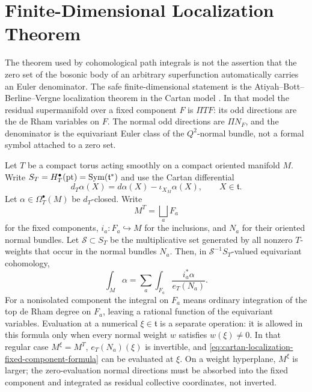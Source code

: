 \section{Finite-Dimensional Localization Theorem}

The theorem used by cohomological path integrals is not the assertion that the
zero set of the bosonic body of an arbitrary superfunction automatically
carries an Euler denominator.  The safe finite-dimensional statement is the
Atiyah--Bott--Berline--Vergne localization theorem in the Cartan model
\cite{AtiyahBott1984MomentMap,BerlineVergne1982Localization}.  In that model
the residual supermanifold over a fixed component \(F\) is \(\Pi TF\): its odd
directions are the de Rham variables on \(F\).  The normal odd directions are
\(\Pi N_F\), and the denominator is the equivariant Euler class of the
\(Q^2\)-normal bundle, not a formal symbol attached to a zero set.

\begin{theorem}
\label{thm:compact-nondegenerate-cohomological-localization}
Let \(T\) be a compact torus acting smoothly on a compact oriented manifold
\(M\).  Write \(S_T=H_T^\bullet({\rm pt})=\operatorname{Sym}(\mathfrak t^*)\)
and use the Cartan differential
\[
  d_T\alpha(X)=d\alpha(X)-\iota_{X_M}\alpha(X),
  \qquad X\in\mathfrak t .
\]
Let \(\alpha\in\Omega_T^\bullet(M)\) be \(d_T\)-closed.  Write
\[
  M^T=\bigsqcup_a F_a
\]
for the fixed components, \(i_a:F_a\hookrightarrow M\) for the inclusions, and
\(N_a\) for their oriented normal bundles.  Let \(\mathcal S\subset S_T\) be
the multiplicative set generated by all nonzero \(T\)-weights that occur in
the normal bundles \(N_a\).  Then, in \(\mathcal S^{-1}S_T\)-valued
equivariant cohomology,
\begin{equation}
  \int_M\alpha
  =
  \sum_a
  \int_{F_a}
  \frac{i_a^*\alpha}{e_T(N_a)} .
  \label{eq:cartan-localization-fixed-component-formula}
\end{equation}
For a nonisolated component the integral on \(F_a\) means ordinary
integration of the top de Rham degree on \(F_a\), leaving a rational function
of the equivariant variables.  Evaluation at a numerical
\(\xi\in\mathfrak t\) is a separate operation: it is allowed in this formula
only when every normal weight \(w\) satisfies \(w(\xi)\ne0\).  In that regular
case \(M^\xi=M^T\), \(e_T(N_a)(\xi)\) is invertible, and
\eqref{eq:cartan-localization-fixed-component-formula} can be evaluated at
\(\xi\).  On a weight hyperplane, \(M^\xi\) is larger; the zero-evaluation
normal directions must be absorbed into the fixed component and integrated as
residual collective coordinates, not inverted.
\end{theorem}

